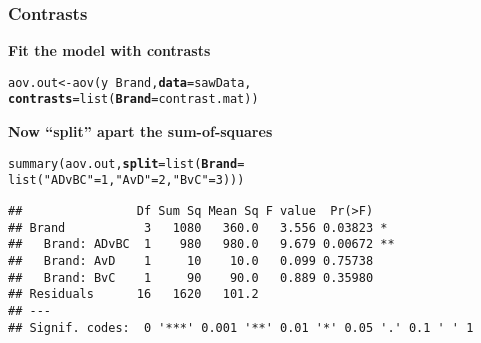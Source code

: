 \documentclass[color=usenames,dvipsnames]{beamer}\usepackage[]{graphicx}\usepackage[]{color}
\makeatletter
\newcommand{\hlnum}[1]{\textcolor[rgb]{0.69,0.494,0}{#1}}%
\newcommand{\hlstr}[1]{\textcolor[rgb]{0.749,0.012,0.012}{#1}}%
\newcommand{\hlopt}[1]{\textcolor[rgb]{0,0,0}{#1}}%
\newcommand{\hlstd}[1]{\textcolor[rgb]{0,0,0}{#1}}%
\newcommand{\hlkwb}[1]{\textcolor[rgb]{0,0.341,0.682}{#1}}%
\newcommand{\hlkwc}[1]{\textcolor[rgb]{0,0,0}{\textbf{#1}}}%
\newcommand{\hlkwd}[1]{\textcolor[rgb]{0.004,0.004,0.506}{#1}}%
\newenvironment{kframe}{%
 \def\at@end@of@kframe{}%
 \ifinner\ifhmode%
  \def\at@end@of@kframe{\end{minipage}}%
  \begin{minipage}{\columnwidth}%
 \fi\fi%
 \def\FrameCommand##1{\hskip\@totalleftmargin \hskip-\fboxsep
 \colorbox{shadecolor}{##1}\hskip-\fboxsep
     \hskip-\linewidth \hskip-\@totalleftmargin \hskip\columnwidth}%
 \MakeFramed {\advance\hsize-\width
   \@totalleftmargin\z@ \linewidth\hsize
   \@setminipage}}%
 {\par\unskip\endMakeFramed%
 \at@end@of@kframe}
\newenvironment{knitrout}{}{} %
\makeatother
\begin{document}





\begin{frame}[fragile]
  \frametitle{Contrasts}
{\bf Fit the model with contrasts}
\begin{footnotesize}
\begin{knitrout}
\color{fgcolor}\begin{kframe}
\begin{alltt}
\hlstd{aov.out} \hlkwb{<-} \hlkwd{aov}\hlstd{(y} \hlopt{~} \hlstd{Brand,} \hlkwc{data}\hlstd{=sawData,}
               \hlkwc{contrasts}\hlstd{=}\hlkwd{list}\hlstd{(}\hlkwc{Brand}\hlstd{=contrast.mat))}
\end{alltt}
\end{kframe}
\end{knitrout}
\pause
\vfill
{\bf Now ``split'' apart the sum-of-squares}
\begin{knitrout}
\color{fgcolor}\begin{kframe}
\begin{alltt}
\hlkwd{summary}\hlstd{(aov.out,} \hlkwc{split} \hlstd{=} \hlkwd{list}\hlstd{(}\hlkwc{Brand} \hlstd{=}
                      \hlkwd{list}\hlstd{(}\hlstr{"ADvBC"}\hlstd{=}\hlnum{1}\hlstd{,} \hlstr{"AvD"}\hlstd{=}\hlnum{2}\hlstd{,} \hlstr{"BvC"}\hlstd{=}\hlnum{3}\hlstd{)))}
\end{alltt}
\begin{verbatim}
##                Df Sum Sq Mean Sq F value  Pr(>F)   
## Brand           3   1080   360.0   3.556 0.03823 * 
##   Brand: ADvBC  1    980   980.0   9.679 0.00672 **
##   Brand: AvD    1     10    10.0   0.099 0.75738   
##   Brand: BvC    1     90    90.0   0.889 0.35980   
## Residuals      16   1620   101.2                   
## ---
## Signif. codes:  0 '***' 0.001 '**' 0.01 '*' 0.05 '.' 0.1 ' ' 1
\end{verbatim}
\end{kframe}
\end{knitrout}
\end{footnotesize}
\end{frame}
\end{document}
